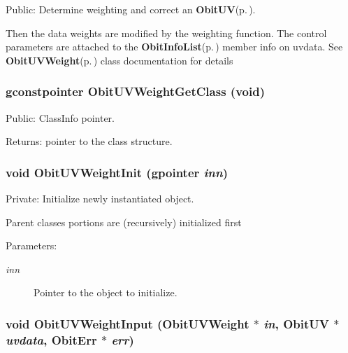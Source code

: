 Public: Determine weighting and correct an {\bf Obit\-UV}{\rm (p.\,\pageref{structObitUV})}. 

Then the data weights are modified by the weighting function. The control parameters are attached to the {\bf Obit\-Info\-List}{\rm (p.\,\pageref{structObitInfoList})} member info on uvdata. See {\bf Obit\-UVWeight}{\rm (p.\,\pageref{structObitUVWeight})} class documentation for details 
\subsubsection{\setlength{\rightskip}{0pt plus 5cm}gconstpointer Obit\-UVWeight\-Get\-Class (void)}\label{ObitUVWeight_8c_a20}


Public: Class\-Info pointer. 

\begin{Desc}
\item[Returns:]pointer to the class structure. \end{Desc}
\subsubsection{\setlength{\rightskip}{0pt plus 5cm}void Obit\-UVWeight\-Init (gpointer {\em inn})}\label{ObitUVWeight_8c_a8}


Private: Initialize newly instantiated object. 

Parent classes portions are (recursively) initialized first \begin{Desc}
\item[Parameters:]
\begin{description}
\item[{\em inn}]Pointer to the object to initialize. \end{description}
\end{Desc}
\subsubsection{\setlength{\rightskip}{0pt plus 5cm}void Obit\-UVWeight\-Input ({\bf Obit\-UVWeight} $\ast$ {\em in}, {\bf Obit\-UV} $\ast$ {\em uvdata}, {\bf Obit\-Err} $\ast$ {\em err})}\label{ObitUVWeight_8c_a10}


